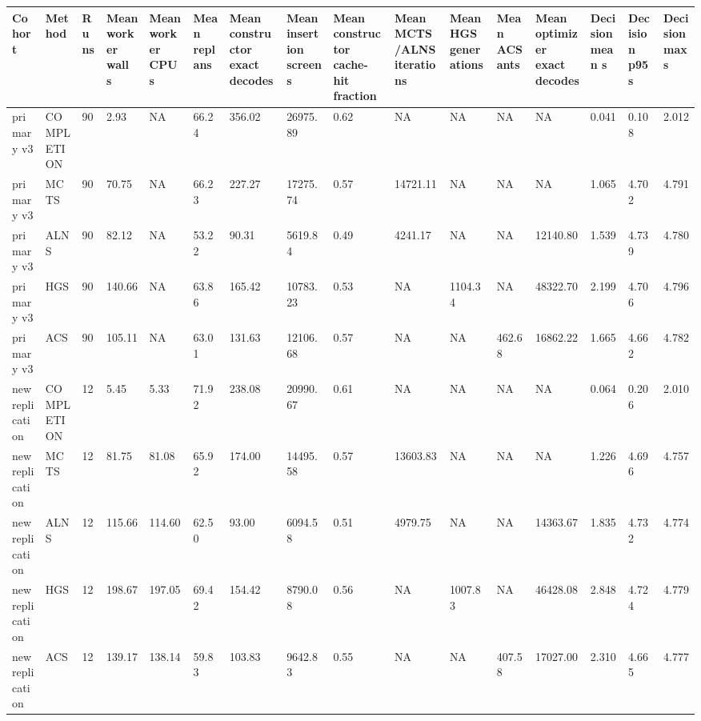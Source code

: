 \begin{tabular}{llllllllllllllll}
\hline
Cohort & Method & Runs & Mean worker wall s & Mean worker CPU s & Mean replans & Mean constructor exact decodes & Mean insertion screens & Mean constructor cache-hit fraction & Mean MCTS/ALNS iterations & Mean HGS generations & Mean ACS ants & Mean optimizer exact decodes & Decision mean s & Decision p95 s & Decision max s \\
\hline
primary v3 & COMPLETION & 90 & 2.93 & NA & 66.24 & 356.02 & 26975.89 & 0.62 & NA & NA & NA & NA & 0.041 & 0.108 & 2.012 \\
primary v3 & MCTS & 90 & 70.75 & NA & 66.23 & 227.27 & 17275.74 & 0.57 & 14721.11 & NA & NA & NA & 1.065 & 4.702 & 4.791 \\
primary v3 & ALNS & 90 & 82.12 & NA & 53.22 & 90.31 & 5619.84 & 0.49 & 4241.17 & NA & NA & 12140.80 & 1.539 & 4.739 & 4.780 \\
primary v3 & HGS & 90 & 140.66 & NA & 63.86 & 165.42 & 10783.23 & 0.53 & NA & 1104.34 & NA & 48322.70 & 2.199 & 4.706 & 4.796 \\
primary v3 & ACS & 90 & 105.11 & NA & 63.01 & 131.63 & 12106.68 & 0.57 & NA & NA & 462.68 & 16862.22 & 1.665 & 4.662 & 4.782 \\
new replication & COMPLETION & 12 & 5.45 & 5.33 & 71.92 & 238.08 & 20990.67 & 0.61 & NA & NA & NA & NA & 0.064 & 0.206 & 2.010 \\
new replication & MCTS & 12 & 81.75 & 81.08 & 65.92 & 174.00 & 14495.58 & 0.57 & 13603.83 & NA & NA & NA & 1.226 & 4.696 & 4.757 \\
new replication & ALNS & 12 & 115.66 & 114.60 & 62.50 & 93.00 & 6094.58 & 0.51 & 4979.75 & NA & NA & 14363.67 & 1.835 & 4.732 & 4.774 \\
new replication & HGS & 12 & 198.67 & 197.05 & 69.42 & 154.42 & 8790.08 & 0.56 & NA & 1007.83 & NA & 46428.08 & 2.848 & 4.724 & 4.779 \\
new replication & ACS & 12 & 139.17 & 138.14 & 59.83 & 103.83 & 9642.83 & 0.55 & NA & NA & 407.58 & 17027.00 & 2.310 & 4.665 & 4.777 \\
\hline
\end{tabular}
